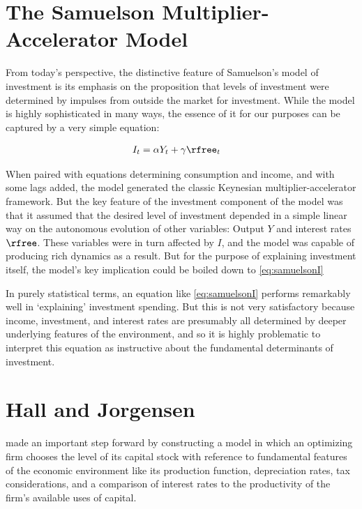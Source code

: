 \documentclass{handout}
\begin{document}
\section{The Samuelson Multiplier-Accelerator Model}

From today's perspective, the distinctive feature of Samuelson's model of investment is its emphasis
on the proposition that levels of investment were determined by impulses from outside the market for
investment.  While the model is highly sophisticated in many ways, the essence of it for our purposes
can be captured by a very simple equation:

\begin{equation}\begin{gathered}\begin{aligned}
I_{t} & =  \alpha Y_{t} + \gamma \rfree_{t} \label{eq:samuelsonI}
\end{aligned}\end{gathered}\end{equation}

When paired with equations determining consumption and income, and with some lags added, the model
generated the classic Keynesian multiplier-accelerator framework.  But the key feature of the investment 
component of the model was that it assumed that the desired level of investment depended in a simple
linear way on the autonomous evolution of other variables: Output $Y$ and interest rates $\rfree$.  These variables
were in turn affected by $I$, and the model was capable of producing rich dynamics as a result.  
But for the purpose of explaining investment itself, the model's key implication could be boiled down to
\eqref{eq:samuelsonI}

In purely statistical terms, an equation like \eqref{eq:samuelsonI}
performs remarkably well in `explaining' investment spending.  But
this is not very satisfactory because income, investment, and interest
rates are presumably all determined by deeper underlying features of
the environment, and so it is highly problematic to interpret this
equation as instructive about the fundamental determinants of
investment.

\section{Hall and Jorgensen}

\cite{hall&jorgenson:i} made an important step forward by constructing a model in which an 
optimizing firm chooses the level of its capital stock with reference to fundamental features 
of the economic environment like its production function, depreciation rates, tax 
considerations, and a comparison of interest rates to the productivity of the firm's available 
uses of capital.  
\end{document}
